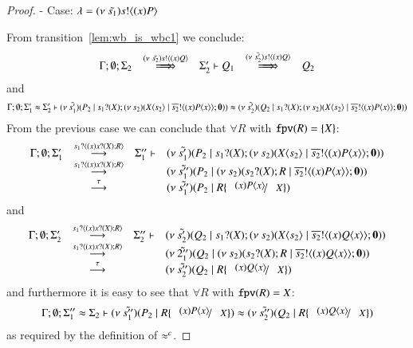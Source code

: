 \begin{proof}
	\noi - Case: $\lambda = (\nu\ \tilde{s_1}) s ! \langle (x) P \rangle$

	\noi From transition~\ref{lem:wb_is_wbc1} we conclude:
\[
	\begin{array}{rclcl}
		\Gamma; \es; \Sigma_2 &\Hby{\news{\tilde{s_2}} \bactout{s}{(x) Q}}& \Sigma_2' \proves Q_1 &\Hby{\news{\tilde{s_2'}} \bactout{s}{(x) Q}}& Q_2\\
	\end{array}
\]
	\noi and
%
	\begin{eqnarray*}
		\Gamma; \emptyset; \Sigma_1' \approx \Sigma_2' \vdash (\nu\ \tilde{s_1'})(P_2 \;|\; s_1 ? (X) ; (\nu\ s_2)(X\langle s_2 \rangle \;|\; \overline{s_2} ! \langle (x) P\langle x \rangle \rangle ; \mathbf{0})) \approx (\nu\ \tilde{s_2'})(Q_2 \;|\; s_1 ? (X) ; (\nu\ s_2)(X\langle s_2 \rangle \;|\; \overline{s_2} ! \langle (x) P\langle x \rangle \rangle ; \mathbf{0})) 
	\end{eqnarray*}
%
	\noi From the  previous case we can conclude that $\forall R$ with $\mathtt{fpv}(R) = \{X\}$:
\[
	\begin{array}{rcll}
		\Gamma; \es; \Sigma_1' &\by{\bactinp{s_1}{(x) \binp{x}{X} R}}& \Sigma_1'' \proves& \newsp{\tilde{s_1'}}{P_2 \Par \binp{s_1}{X} \newsp{s_2}{\appl{X}{s_2} \Par \bout{\dual{s_2}}{(x) \appl{P}{x}} \inact}} \\
		 &\by{\bactinp{s_1}{(x) \binp{x}{X} R}}& &\newsp{\tilde{s_1''}}{P_2 \Par \newsp{s_2}{\binp{s_2}{X} R \Par \bout{\dual{s_2}}{(x) \appl{P}{x}} \inact}}\\
		&\by{\tau}&& \newsp{\tilde{s_1''}}{P_2 \Par  R \subst{(x) \appl{P}{x}}{X}}
	\end{array}
\]
	\noi and
\[
	\begin{array}{rcll}
		\Gamma; \es; \Sigma_2' &\by{\bactinp{s_1}{(x) \binp{x}{X} R}}& \Sigma_2'' \proves& \newsp{\tilde{s_2'}}{Q_2 \Par \binp{s_1}{X} \newsp{s_2}{\appl{X}{s_2} \Par \bout{\dual{s_2}}{(x) \appl{Q}{x}} \inact}} \\
		 &\by{\bactinp{s_1}{(x) \binp{x}{X} R}}& &\newsp{\tilde{2_1''}}{Q_2 \Par \newsp{s_2}{\binp{s_2}{X} R \Par \bout{\dual{s_2}}{(x) \appl{Q}{x}} \inact}}\\
		&\by{\tau}&& \newsp{\tilde{s_2''}}{Q_2 \Par  R \subst{(x) \appl{Q}{x}}{X}}
	\end{array}
\]
	\noi and furthermore it is easy to see that $\forall R$ with $\mathtt{fpv}(R) = X$:
\[
	\Gamma; \es; \Sigma_1'' \wb \Sigma_2 \proves \newsp{\tilde{s_1''}}{P_2 \Par  R \subst{(x) \appl{P}{x}}{X}} \wb \newsp{\tilde{s_2''}}{Q_2 \Par  R \subst{(x) \appl{Q}{x}}{X}}
\]
	\noi as required by the definition of $\approx^{c}$.



\end{proof}
